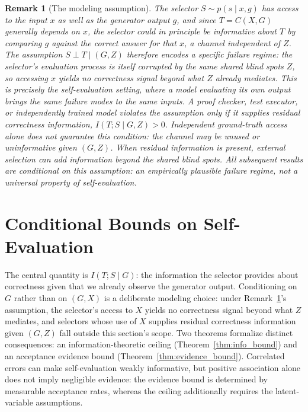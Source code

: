 \documentclass[a4paper,journal]{IAENGtran}
\newtheorem{Remark}[Theorem]{Remark}
\begin{document}
\begin{Remark}[The modeling assumption]
\label{rem:ci_assumption}
The selector $S \sim p(s \mid x, g)$ has access to the input $x$ as well as the generator output $g$, and since $T=C(X,G)$ generally depends on $x$, the selector could in principle be informative about $T$ by comparing $g$ against the correct answer for that $x$, a channel independent of $Z$. The assumption $S \perp T \mid (G, Z)$ therefore encodes a specific failure regime: the selector's evaluation process is itself corrupted by the same shared blind spots $Z$, so accessing $x$ yields no correctness signal beyond what $Z$ already mediates. This is precisely the self-evaluation setting, where a model evaluating its own output brings the same failure modes to the same inputs. A proof checker, test executor, or independently trained model violates the assumption only if it supplies residual correctness information, $I(T;S\mid G,Z)>0$. Independent ground-truth access alone does not guarantee this condition: the channel may be unused or uninformative given $(G,Z)$. When residual information is present, external selection can add information beyond the shared blind spots. All subsequent results are conditional on this assumption: an empirically plausible failure regime, not a universal property of self-evaluation.
\end{Remark}

\section{Conditional Bounds on Self-Evaluation}
\label{sec:self_eval_fails}

The central quantity is $I(T;S\mid G)$: the information the selector provides about
correctness given that we already observe the generator output. Conditioning on $G$
rather than on $(G,X)$ is a deliberate modeling choice: under
Remark~\ref{rem:ci_assumption}'s assumption, the selector's access to $X$ yields no
correctness signal beyond what $Z$ mediates, and selectors whose use of $X$ supplies
residual correctness information given $(G,Z)$ fall outside this section's scope. Two
theorems formalize distinct consequences: an information-theoretic ceiling
(Theorem~\ref{thm:info_bound}) and an acceptance evidence bound
(Theorem~\ref{thm:evidence_bound}). Correlated errors can make self-evaluation weakly
informative, but positive association alone does not imply negligible evidence: the
evidence bound is determined by measurable acceptance rates, whereas the ceiling
additionally requires the latent-variable assumptions.
\end{document}
